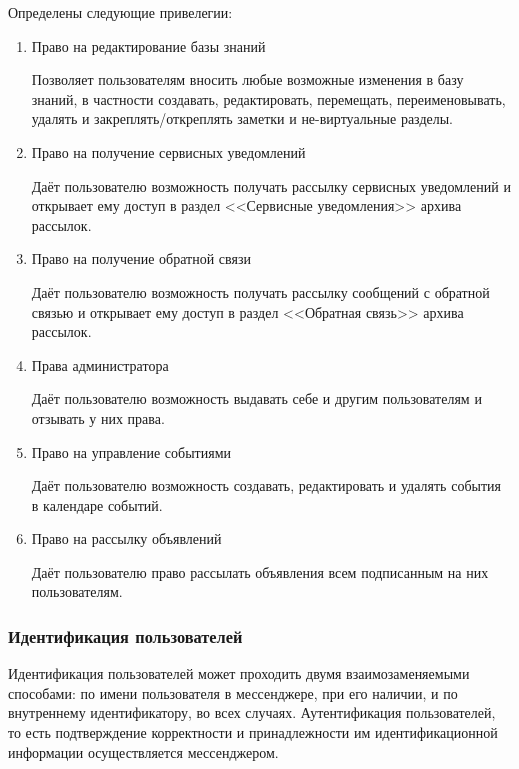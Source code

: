     Определены следующие привелегии:
    \begin{enumerate}
        \item \label{itm:req:sec:privs:kbedit}
            Право на редактирование базы знаний

            Позволяет пользователям вносить любые возможные изменения в базу знаний,
            в частности создавать, редактировать, перемещать, переименовывать, удалять
            и закреплять/откреплять заметки и не-виртуальные разделы.

        \item \label{itm:req:sec:privs:service}
            Право на получение сервисных уведомлений

            Даёт пользователю возможность получать рассылку сервисных уведомлений и открывает ему доступ
            в раздел <<Сервисные уведомления>> архива рассылок.

        \item \label{itm:req:sec:privs:feedback}
            Право на получение обратной связи

            Даёт пользователю возможность получать рассылку сообщений с обратной связью и
            открывает ему доступ в раздел <<Обратная связь>> архива рассылок.

        \item \label{itm:req:sec:privs:admin}
            Права администратора

            Даёт пользователю возможность выдавать себе и другим пользователям и
            отзывать у них права.

        \item \label{itm:req:sec:privs:calendar}
            Право на управление событиями

            Даёт пользователю возможность создавать, редактировать и удалять события в календаре событий.

        \item \label{itm:req:sec:privs:announce}
            Право на рассылку объявлений

            Даёт пользователю право рассылать объявления всем подписанным на них пользователям.
    \end{enumerate}

\subsubsection{Идентификация пользователей}
    \label{sec:req:sec:id}
    Идентификация пользователей может проходить двумя взаимозаменяемыми способами:
    по имени пользователя в мессенджере, при его наличии, и по внутреннему идентификатору,
    во всех случаях. Аутентификация пользователей, то есть подтверждение корректности и
    принадлежности им идентификационной информации осуществляется мессенджером.


